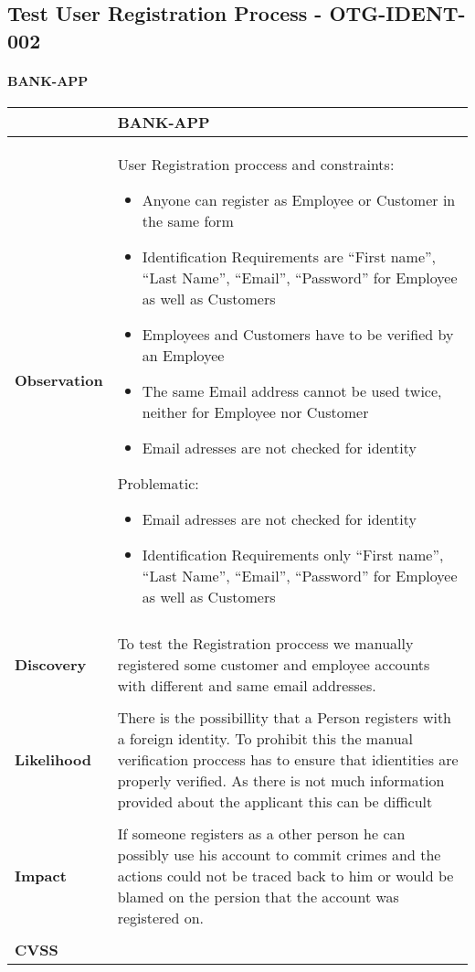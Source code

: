 \subsection{Test User Registration Process - OTG-IDENT-002}
\paragraph{BANK-APP} \mbox{}
\begin{longtable*}{p{.20\textwidth} | p{.80\textwidth}}
    \hline
    & \textbf{BANK-APP} \\ 
    \hline
    \textbf{Observation} &
        User Registration proccess and constraints:
		\begin{itemize}
		  \item Anyone can register as Employee or Customer in the same form
		  \item Identification Requirements are \enquote{First name}, \enquote{Last Name}, \enquote{Email}, \enquote{Password} for Employee as well as Customers
		  \item Employees and Customers have to be verified by an Employee
		  \item The same Email address cannot be used twice, neither for Employee nor Customer
		  \item Email adresses are not checked for identity
		\end{itemize}
		Problematic:
		\begin{itemize}
		  \item Email adresses are not checked for identity
		  \item Identification Requirements only \enquote{First name}, \enquote{Last Name}, \enquote{Email}, \enquote{Password} for Employee as well as Customers
		\end{itemize}
    \\\\
    \textbf{Discovery} &
        To test the Registration proccess we manually registered some customer and employee accounts with different and same email addresses.
    \\\\
    \textbf{Likelihood} &
        There is the possibillity that a Person registers with a foreign identity. To prohibit this the manual verification proccess has to ensure that idientities are properly verified. As there is not much information provided about the applicant this can be difficult
    \\\\
    \textbf{Impact} &
       If someone registers as a other person he can possibly use his account to commit crimes and the actions could not be traced back to him or would be blamed on the persion that the account was registered on.
    \\\\
    \textbf{CVSS} &
        
    \\
    \hline
\end{longtable*}
\clearpage
